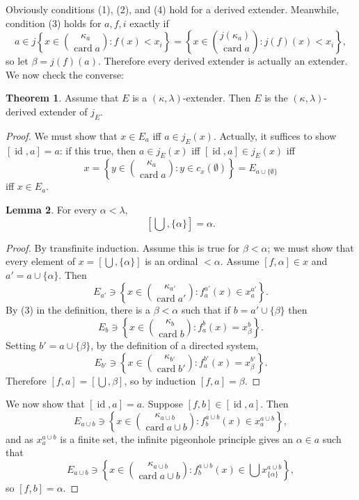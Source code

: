 \documentclass[12pt]{report}
\newcommand{\card}{\operatorname{card}}
\newcommand{\id}{\operatorname{id}}
\theoremstyle{definition}
\newtheorem{theorem}{Theorem}[chapter]
\newtheorem{lemma}[theorem]{Lemma}
\begin{document}
Obviously conditions (1), (2), and (4) hold for a derived extender. Meanwhile, condition (3) holds for $a,f,i$ exactly if
$$a \in j\left\{x \in \binom{\kappa_a}{\card a}: f(x) < x_i\right\} = \left\{x \in \binom{j(\kappa_a)}{\card a}: j(f)(x) < x_i\right\},$$
so let $\beta = j(f)(a)$.
Therefore every derived extender is actually an extender. We now check the converse:
\begin{theorem}
Assume that $E$ is a $(\kappa, \lambda)$-extender. Then $E$ is the $(\kappa, \lambda)$-derived extender of $j_E$.
\end{theorem}
\begin{proof}
We must show that $x \in E_a$ iff $a \in j_E(x)$. Actually, it suffices to show $[\id, a] = a$: if this true, then $a \in j_E(x)$ iff $[\id, a] \in j_E(x)$ iff
$$x = \left\{y \in \binom{\kappa_a}{\card a}: y \in c_x(\emptyset)\right\} = E_{a \cup \{\emptyset\}}$$
iff $x \in E_a$.

\begin{lemma}
For every $\alpha < \lambda$,
$$\left[\bigcup, \{\alpha\}\right] = \alpha.$$
\end{lemma}
\begin{proof}
By transfinite induction. Assume this is true for $\beta < \alpha$; we must show that every element of $x = \left[\bigcup, \{\alpha\}\right]$ is an ordinal $<\alpha$.
Assume $[f, \alpha] \in x$ and $a' = a \cup \{\alpha\}$. Then
$$E_{a'} \ni \left\{x \in \binom{\kappa_{a'}}{\card a'}: f_a^{a'}(x) \in x_a^{a'}\right\}.$$
By (3) in the definition, there is a $\beta < \alpha$ such that if $b = a' \cup \{\beta\}$ then
$$E_b \ni \left\{ x \in \binom{\kappa_b}{\card b}: f_a^b(x) = x_\beta^b\right\}.$$
Setting $b' = a \cup \{\beta\}$, by the definition of a directed system,
$$E_{b'} \ni \left\{x \in \binom{\kappa_{b'}}{\card b'}: f_a^{b'}(x) = x_\beta^{b'}\right\}.$$
Therefore $[f, a] = \left[\bigcup, \beta\right]$, so by induction $[f, a] = \beta$.
\end{proof}

We now show that $[\id, a] = a$. Suppose $[f, b] \in [\id, a]$. Then
$$E_{a \cup b} \ni \left\{x \in \binom{\kappa_{a \cup b}}{\card a \cup b}: f_b^{a \cup b}(x) \in x_a^{a \cup b}\right\},$$
and as $x_a^{a \cup b}$ is a finite set, the infinite pigeonhole principle gives an $\alpha \in a$ such that
$$E_{a \cup b} \ni \left\{x \in \binom{\kappa_{a \cup b}}{\card a \cup b}: f_b^{a \cup b}(x) \in \bigcup x_{\{\alpha\}}^{a \cup b}\right\},$$
so $[f, b] = \alpha$.
\end{proof}
\end{document}
